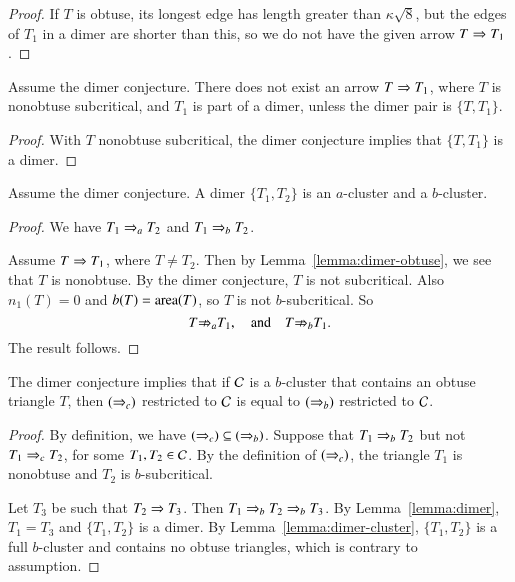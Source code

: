 \begin{proof}  
  If $T$ is obtuse, its longest edge has length greater than
  $\kappa\sqrt8$, but the edges of $T_1$ in a dimer are shorter than
  this, so we do not have the given arrow $T\Rightarrow T_1$.
\end{proof}

\begin{lemma}
  Assume the dimer conjecture.  There does not exist an arrow $T\Rightarrow
  T_1$, where $T$ is nonobtuse subcritical, and $T_1$ is part of a
  dimer, unless the dimer pair is $\{T,T_1\}$.
\end{lemma}


\begin{proof}
  With $T$ nonobtuse subcritical, the dimer conjecture implies that
  $\{T,T_1\}$ is a dimer.
\end{proof}

\begin{lemma}\label{lemma:dimer-cluster}
Assume the dimer conjecture.  A dimer $\{T_1,T_2\}$ is an $a$-cluster and
a $b$-cluster.
\end{lemma}

\begin{proof}  
We have $T_1 \Rightarrow_{a} T_2$ and $T_1 \Rightarrow_{b} T_2$.

Assume $T\Rightarrow T_1$, where $T\ne T_2$.  Then by
Lemma~\ref{lemma:dimer-obtuse}, we see that $T$ is nonobtuse.  By the
dimer conjecture, $T$ is not subcritical.  Also $n_1(T) = 0$ and
$b(T)={\operatorname{area}}(T)$, so $T$ is not $b$-subcritical.  So
\[
T{\nRightarrow}_{a} T_1,\quad\text{and}\quad T{\nRightarrow}_{b} T_1.
\]
The result follows.
\end{proof}



\begin{lemma}\label{lemma:b=c}  
The dimer conjecture implies that if $\mathcal C$ is a $b$-cluster
that contains an obtuse triangle $T$, then $(\Rightarrow_{c})$ restricted to $\mathcal C$ is
equal to $(\Rightarrow_{b})$ restricted to $\mathcal C$.
\end{lemma}

\begin{proof} By definition, we have $(\Rightarrow_{c})\subseteq (\Rightarrow_{b})$.
  Suppose that $T_1\Rightarrow_{b} T_2$ but not $T_1 \Rightarrow_{c} T_2$, for some
  $T_1,T_2\in\mathcal C$.  By the definition of $(\Rightarrow_{c})$, the triangle $T_1$
  is nonobtuse and $T_2$ is $b$-subcritical.

  Let $T_3$ be such that $T_2\Rightarrow T_3$.  Then $T_1\Rightarrow_{b} T_2\Rightarrow_{b}
  T_3$.  By Lemma~\ref{lemma:dimer}, $T_1=T_3$ and $\{T_1,T_2\}$ is a
  dimer.  By Lemma~\ref{lemma:dimer-cluster}, $\{T_1,T_2\}$ is a full
  $b$-cluster and contains no obtuse triangles, which is contrary to
  assumption.
\end{proof}

